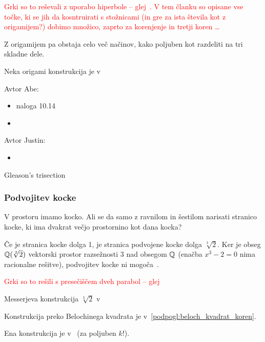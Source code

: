 
\textcolor{red}{Grki so to reševali z uporabo hiperbole -- glej~\cite[str.\ 9]{videla1997}. V tem članku so opisane vse točke, ki se jih da kosntruirati s stožnicami (in gre za ista števila kot z origamijem?) dobimo množico, zaprto za korenjenje in tretji koren \ldots}

Z origamijem pa obstaja celo več načinov, kako poljuben kot razdeliti na tri skladne dele.

Neka origami konstrukcija je v~\cite[str.\ 155]{geometricconstructions}


Avtor Abe:
\begin{itemize}
    \item naloga 10.14~\cite[str.\ 158 spodaj]{geometricconstructions}
    \item \cite[str.\ 33]{lang2013}
\end{itemize}

Avtor Justin:
\begin{itemize}
    \item \cite[str.\ 34]{lang2013}
\end{itemize}

Gleason's trisection~\cite{gleason1988}

\subsubsection{Podvojitev kocke}


V prostoru imamo kocko. Ali se da samo z ravnilom in šestilom narisati stranico kocke, ki ima dvakrat večjo prostornino kot dana kocka?

Če je stranica kocke dolga 1, je stranica podvojene kocke dolga $\sqrt[3]{2}$. Ker je obseg $\mathbb Q(\sqrt[3]{2})$ vektorski prostor razsežnosti $3$ nad obsegom $\mathbb Q$ (enačba $ x^3 - 2 = 0 $ nima racionalne rešitve), podvojitev kocke ni mogoča~\cite[str. 78]{jerman1998}.

\textcolor{red}{Grki so to rešili s presečiščem dveh parabol -- glej~\cite[str.\ 5--6]{videla1997}}

Messerjeva konstrukcija $\sqrt[3]{2}$ v~\cite[str.\ 46]{land2013}

Konstrukcija preko Belochinega kvadrata je v~\ref{podpogl:beloch_kvadrat_koren}.

Ena konstrukcija je v~\cite[str.\ 156]{geometricconstructions} (za poljuben $k$!).